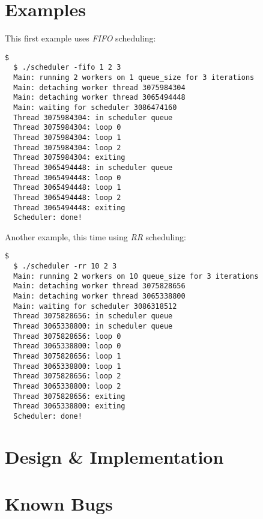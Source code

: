 \documentclass[paper=a4, fontsize=11pt]{scrartcl}
\begin{document}
\section*{Examples}
This first example uses \textit{FIFO} scheduling:
\begin{lstlisting}[style=ShellStyle]$
  $ ./scheduler -fifo 1 2 3
  Main: running 2 workers on 1 queue_size for 3 iterations
  Main: detaching worker thread 3075984304
  Main: detaching worker thread 3065494448
  Main: waiting for scheduler 3086474160
  Thread 3075984304: in scheduler queue
  Thread 3075984304: loop 0
  Thread 3075984304: loop 1
  Thread 3075984304: loop 2
  Thread 3075984304: exiting
  Thread 3065494448: in scheduler queue
  Thread 3065494448: loop 0
  Thread 3065494448: loop 1
  Thread 3065494448: loop 2
  Thread 3065494448: exiting
  Scheduler: done!
\end{lstlisting}
\pagebreak
Another example, this time using \textit{RR} scheduling:
\begin{lstlisting}[style=ShellStyle]$
  $ ./scheduler -rr 10 2 3
  Main: running 2 workers on 10 queue_size for 3 iterations
  Main: detaching worker thread 3075828656
  Main: detaching worker thread 3065338800
  Main: waiting for scheduler 3086318512
  Thread 3075828656: in scheduler queue
  Thread 3065338800: in scheduler queue
  Thread 3075828656: loop 0
  Thread 3065338800: loop 0
  Thread 3075828656: loop 1
  Thread 3065338800: loop 1
  Thread 3075828656: loop 2
  Thread 3065338800: loop 2
  Thread 3075828656: exiting
  Thread 3065338800: exiting
  Scheduler: done!
\end{lstlisting}

\section*{Design \& Implementation}

\section*{Known Bugs}
\end{document}
